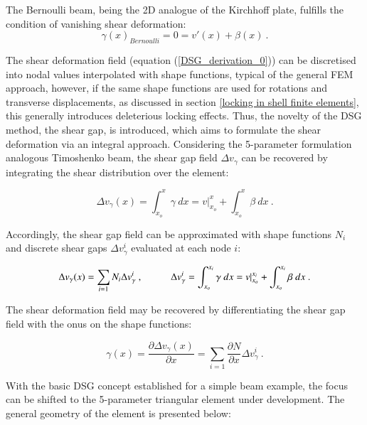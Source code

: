 The Bernoulli beam, being the 2D analogue of the Kirchhoff plate, fulfills the condition of vanishing shear deformation:
\begin{equation} 
\gamma(x)_{Bernoulli} = 0 = v'(x) + \beta(x)
\label{DSG_derivation_1}\ .
\end{equation}

The shear deformation field (equation (\ref{DSG_derivation_0})) can be discretised into nodal values interpolated with shape functions, typical of the general FEM approach, however, if the same shape functions are used for rotations and transverse displacements, as discussed in section \ref{locking in shell finite elements}, this generally introduces deleterious locking effects. Thus, the novelty of the DSG method, the shear gap, is introduced, which aims to formulate the shear deformation via an integral approach. Considering the 5-parameter formulation analogous Timoshenko beam, the shear gap field $\Delta v_\gamma$ can be recovered by integrating the shear distribution over the element:

\begin{equation} 
\Delta v_\gamma(x) 
= \int_{x_o}^x \gamma \ dx
= v |_{x_o}^x +  \int_{x_o}^x \beta \ dx
\label{DSG_derivation_2}\ .
\end{equation}

Accordingly, the shear gap field can be approximated with shape functions $N_i$ and discrete shear gaps $ \Delta v_{\gamma}^i$ evaluated at each node $i$:

\begin{equation} 
\Delta v_\gamma(x) = \sum_{i=1} N_i \Delta v_{\gamma}^i\ ,
\hspace{10mm} 
\Delta v_\gamma^i 
= \int_{x_o}^{x_i} \gamma \ dx
= v |_{x_o}^{x_i} +  \int_{x_o}^{x_i} \beta \ dx
\label{DSG_derivation_3}\ .
\end{equation}

The shear deformation field may be recovered by differentiating the shear gap field with the onus on the shape functions:

\begin{equation} 
\gamma(x) = \frac{\partial \Delta v_\gamma(x) }{\partial x}
=  \sum_{i=1} \frac{\partial N}{\partial x}\Delta v_{\gamma}^i
\label{DSG_derivation_4}\ .
\end{equation}

With the basic DSG concept established for a simple beam example, the focus can be shifted to the 5-parameter triangular element under development. The general geometry of the element is presented below:

